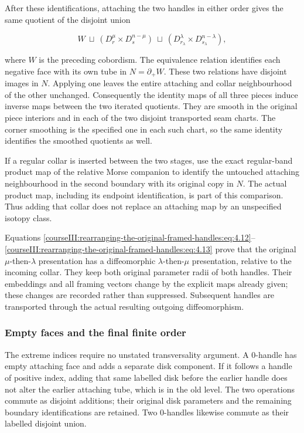 After these identifications, attaching the two handles in either order gives the same quotient of the disjoint union

\begin{equation}
W\ \sqcup\
(D_r^\mu\times D_s^{n-\mu})\ \sqcup\
(D_{r_\lambda}^{\lambda}\times D_{s_\lambda}^{n-\lambda}),
\label{courseIII:rearranging-the-original-framed-handles:eq:4.13}
\end{equation}

where \(W\) is the preceding cobordism. The equivalence relation identifies each negative face with its own tube in \(N=\partial_+W\). These two relations have disjoint images in \(N\). Applying one leaves the entire attaching and collar neighbourhood of the other unchanged. Consequently the identity maps of all three pieces induce inverse maps between the two iterated quotients. They are smooth in the original piece interiors and in each of the two disjoint transported seam charts. The corner smoothing is the specified one in each such chart, so the same identity identifies the smoothed quotients as well.

If a regular collar is inserted between the two stages, use the exact regular-band product map of the relative Morse companion to identify the untouched attaching neighbourhood in the second boundary with its original copy in \(N\). The actual product map, including its endpoint identification, is part of this comparison. Thus adding that collar does not replace an attaching map by an unspecified isotopy class.

Equations \eqref{courseIII:rearranging-the-original-framed-handles:eq:4.12}--\eqref{courseIII:rearranging-the-original-framed-handles:eq:4.13} prove that the original \(\mu\)-then-\(\lambda\) presentation has a diffeomorphic \(\lambda\)-then-\(\mu\) presentation, relative to the incoming collar. They keep both original parameter radii of both handles. Their embeddings and all framing vectors change by the explicit maps already given; these changes are recorded rather than suppressed. Subsequent handles are transported through the actual resulting outgoing diffeomorphism.

\subsubsection{Empty faces and the final finite order}
\label{courseIII:rearranging-the-original-framed-handles:section-4.4}

The extreme indices require no unstated transversality argument. A \(0\)-handle has empty attaching face and adds a separate disk component. If it follows a handle of positive index, adding that same labelled disk before the earlier handle does not alter the earlier attaching tube, which is in the old level. The two operations commute as disjoint additions; their original disk parameters and the remaining boundary identifications are retained. Two \(0\)-handles likewise commute as their labelled disjoint union.

